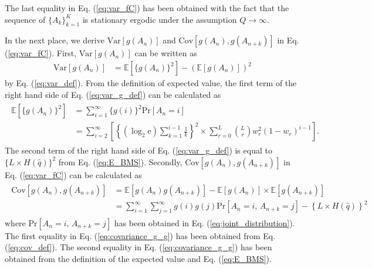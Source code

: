 \documentclass[dvipdfmx,english]{ampmt} %
\begin{document}
The last equality in Eq. (\ref{eq:var_fC}) has been obtained with the fact that the sequence of $\{A_k\}_{k=1}^{K}$ is stationary ergodic under the assumption $Q\to\infty$.
\par
In the next place, we derive $\mathrm{Var} [g(A_n)]$ and $\mathrm{Cov}[g(A_n),g(A_{n+k})]$ in Eq. (\ref{eq:var_fC}). First, $\mathrm{Var} [g(A_n)]$ can be written as
\begin{align}\label{eq:var_g_def}
  \mathrm{Var}[g(A_n)] 
  &= \mathbb{E}[\{g(A_n)\}^2] - (\mathbb{E}[g(A_n)])^2 
\end{align}
by Eq. (\ref{eq:var_def}). From the definition of expected value, the first term of the right hand side of Eq. (\ref{eq:var_g_def}) can be calculated as
\begin{align}\begin{split}\label{eq:expectation_g_An_square}
  \mathbb{E}[\{g(A_n)\}^2] &= \sum_{i=1}^{\infty} \{g(i)\}^2 \mathrm{Pr}[A_n=i]\\
  &=\sum_{i=2}^{\infty} \left[\left\{ (\log_2 \mathrm{e}) \sum_{k=1}^{i-1} \frac{1}{k} \right\}^2 \times \sum_{r=0}^{L} \binom{L}{r} w_r^2 (1-w_r)^{i-1}\right]. 
\end{split}\end{align}
The second term of the right hand side of Eq. (\ref{eq:var_g_def}) is equal to $\{L \times H(\hat{q})\}^2$ from Eq. (\ref{eq:E_BMS}).
%
Secondly, $\mathrm{Cov}[g(A_n),g(A_{n+k})]$ in Eq. (\ref{eq:var_fC}) can be calculated as
\begin{align}\label{eq:covariance_g_g}
\begin{split}
  \mathrm{Cov}[g(A_n),g(A_{n+k})] 
  &= \mathbb{E}[g(A_n) g(A_{n+k})] - \mathbb{E}[g(A_n)]\times\mathbb{E}[g(A_{n+k})] \\
  &= \sum_{i=1}^{\infty}\sum_{j=1}^{\infty}g(i)g(j)\mathrm{Pr}[A_n=i, \, A_{n+k}=j] - \left\{L \times H(\hat{q})\right\}^2
\end{split}
\end{align}
where $\mathrm{Pr}[A_n=i, \, A_{n+k}=j]$ has been obtained in Eq. (\ref{eq:joint_distribution}).
The first equality in Eq. (\ref{eq:covariance_g_g}) has been obtained from Eq. (\ref{eq:cov_def}). The second equality in Eq. (\ref{eq:covariance_g_g}) has been obtained from the definition of the expected value and Eq. (\ref{eq:E_BMS}).
\end{document}

